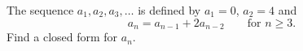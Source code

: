 The sequence $a_1,a_2,a_3,\dots$ is defined by $a_1=0$, $a_2=4$ and
\[a_n=a_{n-1}+2a_{n-2}\qquad\text{for }n\ge3.\]
Find a closed form for $a_n$.
